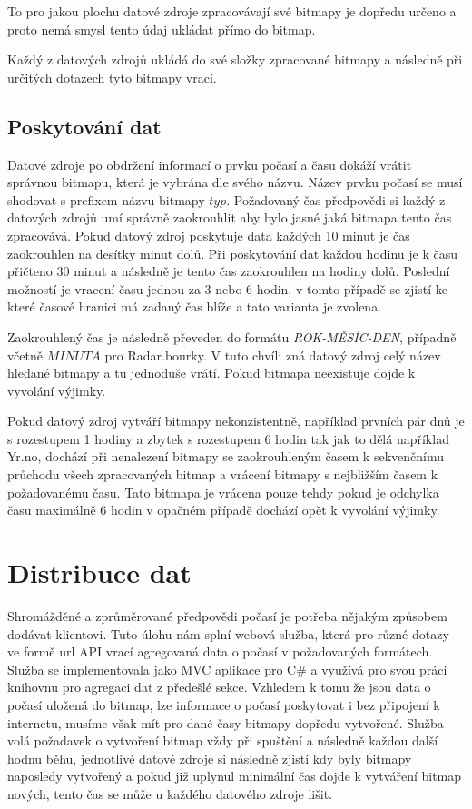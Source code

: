 \documentclass[czech,bachelor,dept460,male,csharp,cpdeclaration]{diploma}
\begin{document}
	To pro jakou plochu datové zdroje zpracovávají své bitmapy je dopředu určeno a proto nemá smysl tento údaj ukládat přímo do bitmap.
	
	Každý z datových zdrojů ukládá do své složky zpracované bitmapy a následně při určitých dotazech tyto bitmapy vrací. 
	
	\section{Poskytování dat}
	
	Datové zdroje po obdržení informací o prvku počasí a času dokáží vrátit správnou bitmapu, která je vybrána dle svého názvu. Název prvku počasí se musí shodovat s prefixem názvu bitmapy $typ$. Požadovaný čas předpovědi si každý z datových zdrojů umí správně zaokrouhlit aby bylo jasné jaká bitmapa tento čas zpracovává. Pokud datový zdroj poskytuje data každých 10 minut je čas zaokrouhlen na desítky minut dolů. Při poskytování dat každou hodinu je k času přičteno 30 minut a následně je tento čas zaokrouhlen na hodiny dolů. Poslední možností je vracení času jednou za 3 nebo 6 hodin, v tomto případě se zjistí ke které časové hranici má zadaný čas blíže a tato varianta je zvolena.
	
	Zaokrouhlený čas je následně převeden do formátu {\it ROK-MĚSÍC-DEN}, případně včetně $MINUTA$ pro Radar.bourky. V tuto chvíli zná datový zdroj celý název hledané bitmapy a tu jednoduše vrátí. Pokud bitmapa neexistuje dojde k vyvolání výjimky.
	
	Pokud datový zdroj vytváří bitmapy nekonzistentně, například prvních pár dnů je s rozestupem 1 hodiny a zbytek s rozestupem 6 hodin tak jak to dělá například Yr.no, dochází při nenalezení bitmapy se zaokrouhleným časem k sekvenčnímu průchodu všech zpracovaných bitmap a vrácení bitmapy s nejbližším časem k požadovanému času. Tato bitmapa je vrácena pouze tehdy pokud je odchylka času maximálně 6 hodin v opačném případě dochází opět k vyvolání výjimky.
	
	\chapter{Distribuce dat}
	
	Shromážděné a zprůměrované předpovědi počasí je potřeba nějakým způsobem dodávat klientovi. Tuto úlohu nám splní webová služba, která pro různé dotazy ve formě url API vrací agregovaná data o počasí v požadovaných formátech. Služba se implementovala jako MVC aplikace pro C\# a využívá pro svou práci knihovnu pro agregaci dat z předešlé sekce. Vzhledem k tomu že jsou data o počasí uložená do bitmap, lze informace o počasí poskytovat i bez připojení k internetu, musíme však mít pro dané časy bitmapy dopředu vytvořené. Služba volá požadavek o vytvoření bitmap vždy při spuštění a následně každou další hodnu běhu, jednotlivé datové zdroje si následně zjistí kdy byly bitmapy naposledy vytvořený a pokud již uplynul minimální čas dojde k vytváření bitmap nových, tento čas se může u každého datového zdroje lišit.
	
\end{document}
